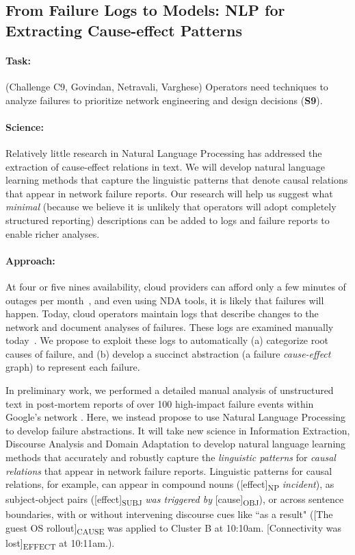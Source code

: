 \subsection{From Failure Logs to Models: NLP for Extracting Cause-effect Patterns}

\paragraph*{Task:} (Challenge C9, Govindan, Netravali, Varghese)  
Operators need techniques to analyze failures to prioritize
network engineering and design decisions (\textbf{S9}).

\paragraph*{Science:} Relatively little research in Natural Language
Processing has addressed the extraction of cause-effect relations in
text. We will develop natural language learning methods that capture
the linguistic patterns that denote causal relations that appear in
network failure reports.  Our research will help us suggest what
\emph{minimal} (because we believe it is unlikely that operators will
adopt completely structured reporting) descriptions can be added
to logs and failure reports to enable richer analyses.

\paragraph*{Approach:}  At four or five nines availability, cloud providers can afford only a few minutes of
outages per month~\cite{rameshgoogle}, and even using NDA tools, it is likely that failures will happen.  Today, cloud operators maintain logs that describe
changes to the network and document analyses of failures.  These logs are 
examined manually today~\cite{rameshgoogle}. We propose
to exploit these logs to automatically (a) categorize root causes of
failure, and (b) develop a succinct abstraction (a failure
\emph{cause-effect} graph) to represent each failure. 

In preliminary work, we performed a detailed manual analysis of
unstructured text in post-mortem reports of over 100 high-impact
failure events within Google’s network \cite{rameshgoogle}. Here, we
instead propose to use Natural Language Processing to develop failure
abstractions. It will take new science in Information Extraction,
Discourse Analysis and Domain Adaptation to develop natural language
learning methods that accurately and robustly capture the {\it
  linguistic patterns} for {\it causal relations} that appear in
network failure reports.
%
Linguistic patterns for causal relations, for example, can appear in
compound nouns ({[{\sc effect}]\textsubscript{NP}} {\it incident}), as
subject-object pairs ({[{\sc effect}]\textsubscript{SUBJ}} {\it was
  triggered by} {[{\sc cause}]\textsubscript{OBJ}}),
or across sentence boundaries, with or without intervening discourse cues
like ``as a result" ({[The guest OS rollout]\textsubscript{CAUSE}} was
applied to Cluster B at 10:10am. {[Connectivity was lost]\textsubscript{EFFECT}}
at 10:11am.).

